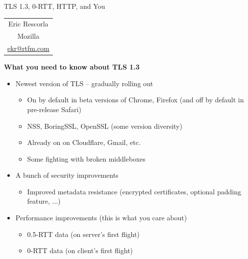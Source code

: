 \documentclass[helvetica]{seminar}
\newcommand{\heading}[1]{%
  \begin{center} 
    \large\bf 
    #1 
  \end{center} 
  \vspace{.4 in}}
\begin{document}
\centerslidestrue


\begin{slide}
\begin{center}
\vspace{1 in}
\LARGE{{\bf}TLS 1.3, 0-RTT, HTTP, and You} \\
\vspace{.2in}
\large{
\begin{tabular}{c}
Eric Rescorla\\
Mozilla\\
\url{ekr@rtfm.com}
\end{tabular}
}
\end{center}

\end{slide}

\centerslidesfalse

\begin{slide}
\heading{What you need to know about TLS 1.3}

\vspace{-5ex}
\begin{itemize}
\item Newest version of TLS -- gradually rolling out
  \begin{itemize}
  \item On by default in beta versions of Chrome, Firefox (and off by default in pre-release Safari)
  \item NSS, BoringSSL, OpenSSL (some version diversity)
  \item Already on on Cloudflare, Gmail, etc.
  \item Some fighting with broken middleboxes
  \end{itemize}
\item A bunch of security improvements
  \begin{itemize}
  \item Improved metadata resistance (encrypted certificates, optional padding feature, ...)
\end{itemize}
\item Performance improvements (this is what you care about)
  \begin{itemize}
  \item 0.5-RTT data (on server’s first flight)
  \item 0-RTT data (on client’s first flight)
  \end{itemize}
\end{itemize}

\end{slide}
\end{document}
